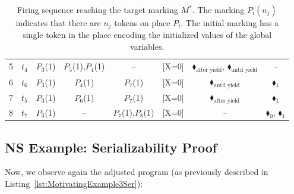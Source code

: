 \begin{table}[H]
\begin{tabular}{c l c c c c c c}
		5 & $t_4$                                  
		& {\color{blue}$P_3$(1)}                  
		& $P_5$(1),$P_4$(1)                          
		& --                                    
		&                                   {\color{blue}[X=0]}     
		&                                    {\color{black}$\blacklozenge_\text{after yield}$}, {\color{black}$\blacklozenge_\text{until yield}$}   
		& --                                    \\
		6 & $t_6$                     
		& {\color{blue}$P_3$(1)}                  
		& $P_4$(1)                                
		& {\color{red}$P_7$(1)}                    
		&                                      	{\color{blue}[X=0]}  
		&                                    {\color{black}$\blacklozenge_\text{until yield}$}   
		&                                   {\color{red}$\blacklozenge_1$}     \\
		7 & $t_5$                                  
		& {\color{blue}$P_3$(1)}                  
		& $P_6$(1)                                
		& {\color{red}$P_7$(1)}                    
		&                                   {\color{blue}[X=0]}    
		&                                    {\color{black}$\blacklozenge_\text{after yield}$}      
		&                                   {\color{red}$\blacklozenge_1$}        \\
		8 & $t_7$                     
		& {\color{blue}$P_3$(1)}                                  
		& --                                    
		& {\color{red}$P_7$(1),\color{red}$P_8$(1)}    
		&                                   {\color{blue}[X=0]}    
		&                                   --    
		&                                   {\color{red}$\blacklozenge_0$}, {\color{red}$\blacklozenge_1$}       \\
		\bottomrule
	\end{tabular}
		\caption{Firing sequence reaching the target marking $M^*$. The marking $P_i(n_j)$ indicates that there are $n_j$ tokens on place $P_i$. The initial marking has a single token in the place encoding the initialized values of the global variables.}
\end{table}


\subsection{NS Example: Serializability Proof}
\label{sec:ns-serializable}

Now, we observe again the adjusted program (as previously described in Listing~\ref{lst:MotivatingExample3Ser}):


